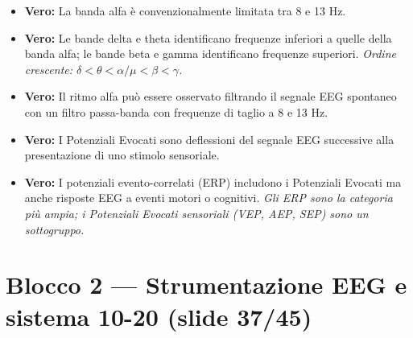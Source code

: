 \begin{itemize}
    \item \textbf{Vero:} La banda alfa è convenzionalmente limitata tra 8 e 13 Hz.
    
    \item \textbf{Vero:} Le bande delta e theta identificano frequenze inferiori a quelle della banda alfa; le bande beta e gamma identificano frequenze superiori.
    \textit{Ordine crescente: $\delta < \theta < \alpha/\mu < \beta < \gamma$.}
    
    \item \textbf{Vero:} Il ritmo alfa può essere osservato filtrando il segnale EEG spontaneo con un filtro passa-banda con frequenze di taglio a 8 e 13 Hz.
    
    \item \textbf{Vero:} I Potenziali Evocati sono deflessioni del segnale EEG successive alla presentazione di uno stimolo sensoriale.
    
    \item \textbf{Vero:} I potenziali evento-correlati (ERP) includono i Potenziali Evocati ma anche risposte EEG a eventi motori o cognitivi.
    \textit{Gli ERP sono la categoria più ampia; i Potenziali Evocati sensoriali (VEP, AEP, SEP) sono un sottogruppo.}
\end{itemize}

\section{Blocco 2 — Strumentazione EEG e sistema 10-20 (slide 37/45)}

